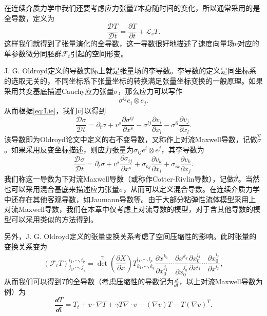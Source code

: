 在连续介质力学中我们还要考虑应力张量$T$本身随时间的变化，所以通常采用的是全导数，定义为
\begin{equation*}
	\frac{\mathcal{D} T}{\mathcal{D}t} = \frac{\partial T}{\partial t} + \mathcal{L}_v T. 
\end{equation*}
这样我们就得到了张量演化的全导数，这一导数很好地描述了速度向量场$v$对应的单参数微分同胚群$\mathcal{F}_t$引起的空间形变\cite{dubrovinmodern}。

J. G. Oldroyd定义的导数实际上就是张量场的李导数。李导数的定义是同坐标系的选取无关的，不同坐标系下张量坐标的转换满足张量坐标变换的一般原理。如果采用共变基底描述Cauchy应力张量$\sigma$，那么应力可以写作
\begin{equation*}{}
	\sigma^{ij} e_i \otimes e_j.
\end{equation*}
从而根据\eqref{eq:Lie}，我们可以得到
\begin{equation}
	\frac{\mathcal{D} \sigma}{\mathcal{D}t} = \partial_t \sigma + v^s \frac{\partial \sigma^{ij}}{\partial x^s} - \sigma^{lj} \frac{\partial v_i}{\partial x_l} -  \sigma^{il} \frac{\partial v_j}{\partial x_l}. 
\end{equation}
该导数即为Oldroyd论文中定义的右不变导数，又称作上对流Maxwell导数，记做$\stackrel{\nabla} \sigma$。如果采用反变坐标描述，则应力张量为$\sigma_{ij} e^i \otimes e^j$，其李导数为
\begin{equation}
	\frac{\mathcal{D} \sigma}{\mathcal{D}t} = \partial_t \sigma + v^s \frac{\partial \sigma_{ij}}{\partial x^s} + \sigma_{kj} \frac{\partial v_k}{\partial x_i} +  \sigma_{ik} \frac{\partial v_k}{\partial x_j}. 
\end{equation}
我们称这一导数为下对流Maxwell导数（或称作Cotter-Rivlin导数），记做$\stackrel{\Delta} \sigma$\cite{oldroyd1950formulation,dimitrienko2010nonlinear}。当然也可以采用混合基底来描述应力张量$\sigma$，从而可以定义混合导数。在连续介质力学中还存在其他客观导数，如Jaumann导数等。由于大部分粘弹性流体模型采用上对流Maxwell导数，我们在本章中仅考虑上对流导数的模型，对于含其他导数的模型可以采用类似的方法得到。

另外，J. G. Oldroyd定义的张量变换关系考虑了空间压缩性的影响。此时张量的变换关系变为
\begin{equation*}
	(\mathcal{F}_t T)^{i_1,\cdots,i_p}_{j_1, \cdots,j_q} = {\det}^\gamma({\frac{\partial X}{\partial x}}) T^{l_1,\cdots,l_p}_{k_1, \cdots,k_q} \frac{\partial x^{k_1}}{\partial x_0^{j_1}} \cdots \frac{\partial x^{k_q}}{\partial x_0^{j_q}} \frac{\partial x_0^{i_1}}{\partial x^{l_1}} \cdots \frac{\partial x_0^{i_p}}{\partial x^{l_p}},  
\end{equation*}
从而我们可以得到$T$的全导数（考虑压缩性的导数记为$\frac{\mathcal{d}}{\mathcal{d} t}$，以上对流Maxwell导数为例）为
\begin{equation*}
	\frac{\mathcal{d} T}{\mathcal{d} t} =  T_t +v \cdot \nabla T + \gamma T \nabla \cdot v - (\nabla v) T - T(\nabla v)^T.   
\end{equation*}

